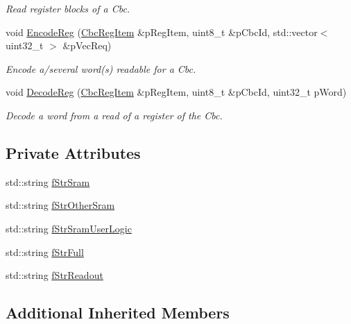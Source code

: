 \begin{DoxyCompactItemize}
\begin{DoxyCompactList}\small\item\em Read register blocks of a Cbc. \end{DoxyCompactList}\item 
void \hyperlink{class_ph2___hw_interface_1_1_cbc_interface_a2718fb251129aef788f6068c53dd1b44}{Encode\-Reg} (\hyperlink{struct_ph2___hw_description_1_1_cbc_reg_item}{Cbc\-Reg\-Item} \&p\-Reg\-Item, uint8\-\_\-t \&p\-Cbc\-Id, std\-::vector$<$ uint32\-\_\-t $>$ \&p\-Vec\-Req)
\begin{DoxyCompactList}\small\item\em Encode a/several word(s) readable for a Cbc. \end{DoxyCompactList}\item 
void \hyperlink{class_ph2___hw_interface_1_1_cbc_interface_acf2c23c04d1f48b3d1ad875d63e6b98e}{Decode\-Reg} (\hyperlink{struct_ph2___hw_description_1_1_cbc_reg_item}{Cbc\-Reg\-Item} \&p\-Reg\-Item, uint8\-\_\-t \&p\-Cbc\-Id, uint32\-\_\-t p\-Word)
\begin{DoxyCompactList}\small\item\em Decode a word from a read of a register of the Cbc. \end{DoxyCompactList}\end{DoxyCompactItemize}
\subsection*{Private Attributes}
\begin{DoxyCompactItemize}
\item 
std\-::string \hyperlink{class_ph2___hw_interface_1_1_cbc_interface_aaddc36b6ef3360c0a99da44c53a3242f}{f\-Str\-Sram}
\item 
std\-::string \hyperlink{class_ph2___hw_interface_1_1_cbc_interface_a3277ad84e5806e7992563dbb6122fdb9}{f\-Str\-Other\-Sram}
\item 
std\-::string \hyperlink{class_ph2___hw_interface_1_1_cbc_interface_a61c9447688cc556e33d7051c26459755}{f\-Str\-Sram\-User\-Logic}
\item 
std\-::string \hyperlink{class_ph2___hw_interface_1_1_cbc_interface_a72fbeb3befe9e533fc21cc568e540df4}{f\-Str\-Full}
\item 
std\-::string \hyperlink{class_ph2___hw_interface_1_1_cbc_interface_ade4f2642613500ee5f1963c22509c48b}{f\-Str\-Readout}
\end{DoxyCompactItemize}
\subsection*{Additional Inherited Members}


